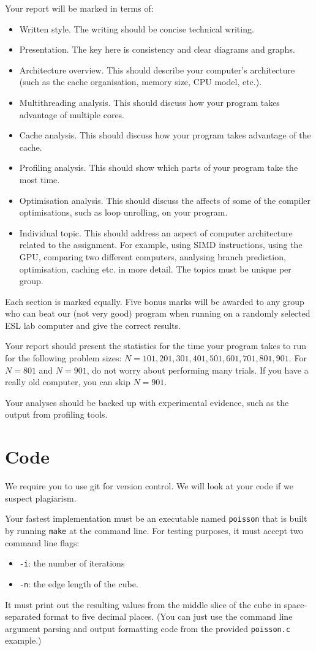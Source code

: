 \documentclass[a4paper,11pt]{article}
\newcommand{\code}[1]{\texttt{#1}}
\begin{document}
Your report will be marked in terms of:
%
\begin{itemize}
\item Written style.  The writing should be concise technical writing.
\item Presentation.  The key here is consistency and clear diagrams
  and graphs.
\item Architecture overview.  This should describe your computer's
  architecture (such as the cache organisation, memory size, CPU model,
  etc.).
\item Multithreading analysis.  This should discuss how your program
  takes advantage of multiple cores.
\item Cache analysis.  This should discuss how your program takes
  advantage of the cache.
\item Profiling analysis.  This should show which parts of your
  program take the most time.
\item Optimisation analysis.  This should discuss the affects of some
  of the compiler optimisations, such as loop unrolling, on your
  program.
\item Individual topic.  This should address an aspect of computer
  architecture related to the assignment.  For example, using SIMD
  instructions, using the GPU, comparing two different computers,
  analysing branch prediction, optimisation, caching etc. in more
  detail.  The topics must be unique per group.
\end{itemize}
%
Each section is marked equally.  Five bonus marks will be awarded to
any group who can beat our (not very good) program when running on a
randomly selected ESL lab computer and give the correct results.

Your report should present the statistics for the time your program
takes to run for the following problem sizes: $N=101, 201, 301, 401,
501, 601, 701, 801, 901$.  For $N=801$ and $N=901$, do not worry about
performing many trials.  If you have a really old computer, you can
skip $N=901$.

Your analyses should be backed up with experimental evidence, such as
the output from profiling tools.


\section{Code}

We require you to use git for version control.  We will look at your
code if we suspect plagiarism.

Your fastest implementation must be an executable named \code{poisson}
that is built by running \code{make} at the command line.  For testing
purposes, it must accept two command line flags:
\begin{itemize}
  \item \code{-i}: the number of iterations
  \item \code{-n}: the edge length of the cube.
\end{itemize}
It must print out the resulting values from the middle slice of the
cube in space-separated format to five decimal places.  (You can just
use the command line argument parsing and output formatting code from
the provided \code{poisson.c} example.)
\end{document}
